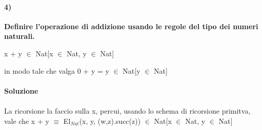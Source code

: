 \paragraph{4)}
\textbf{Definire l'operazione di addizione usando le regole del tipo dei numeri naturali.}
\begin{center} x + y $\in$ Nat[x $\in$ Nat, y $\in$ Nat]\end{center}
in modo tale che valga 0 + y = y $\in$  Nat[y $\in$ Nat]
\\\\
\textbf{Soluzione}\\\\
La ricorsione la faccio sulla x, percui, usando lo schema di ricorsione primitva, vale che x + y $\equiv$ El$_{Nat}$(x, y, (w,z).succ(z)) $\in$ Nat[x $\in$ Nat, y $\in$ Nat]

